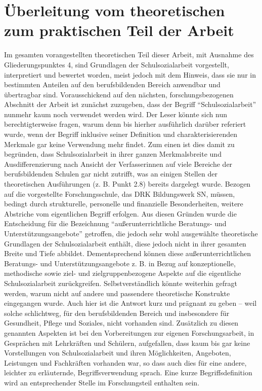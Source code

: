 \section{Überleitung vom theoretischen zum praktischen Teil der Arbeit}
\label{sec:ÜberleitungVomTheoretischenZumPraktischenTeilDerArbeit}

Im gesamten vorangestellten theoretischen Teil dieser Arbeit, mit Ausnahme des Gliederungspunktes 4,  sind Grundlagen der Schulsozialarbeit vorgestellt, interpretiert und bewertet worden, meist jedoch mit dem Hinweis, dass sie nur in bestimmten Anteilen auf den berufsbildenden Bereich anwendbar und übertragbar sind. Vorausschickend auf den nächsten, forschungsbezogenen Abschnitt der Arbeit ist zunächst zuzugeben, dass der Begriff "`Schulsozialarbeit"' nunmehr kaum noch verwendet werden wird. Der Leser könnte sich nun berechtigterweise fragen, warum denn bis hierher ausführlich darüber referiert wurde, wenn der Begriff inklusive seiner Definition und charakterisierenden Merkmale gar keine Verwendung mehr findet. Zum einen ist dies damit zu begründen, dass Schulsozialarbeit in ihrer ganzen Merkmalsbreite und Ausdifferenzierung nach Ansicht der Verfasserinnen auf viele Bereiche der berufsbildenden Schulen gar nicht zutrifft, was an einigen Stellen der theoretischen Ausführungen (z. B. Punkt 2.8) bereits dargelegt wurde. Bezogen auf die vorgestellte Forschungsschule, das DRK Bildungswerk SN, müssen, bedingt durch strukturelle, personelle und finanzielle Besonderheiten, weitere Abstriche vom eigentlichen Begriff erfolgen. Aus diesen Gründen wurde die Entscheidung für die Bezeichnung "`außerunterrichtliche Beratungs- und Unterstützungsangebote"' getroffen, die jedoch sehr wohl ausgewählte theoretische Grundlagen der Schulsozialarbeit enthält, diese jedoch nicht in ihrer gesamten Breite und Tiefe abbildet. Dementsprechend können diese außerunterrichtlichen Beratungs- und Unterstützungsangebote z. B. in Bezug auf konzeptionelle, methodische sowie ziel- und zielgruppenbezogene Aspekte auf die eigentliche Schulsozialarbeit zurückgreifen. 
Selbstverständlich könnte weiterhin gefragt werden, warum nicht auf andere und passendere theoretische Konstrukte eingegangen wurde. Auch hier ist die Antwort kurz und prägnant zu geben -- weil solche schlichtweg, für den berufsbildenden Bereich und insbesondere für Gesundheit, Pflege und Soziales, nicht vorhanden sind. Zusätzlich zu diesen genannten Aspekten ist bei den Vorbereitungen zur eigenen Forschungsarbeit, in Gesprächen mit Lehrkräften und Schülern, aufgefallen, dass kaum bis gar keine Vorstellungen von Schulsozialarbeit und ihren Möglichkeiten, Angeboten, Leistungen und Fachkräften vorhanden war, so dass auch dies für eine andere, leichter zu erläuternde, Begriffsverwendung sprach. Eine kurze Begriffsdefinition wird an entsprechender Stelle im Forschungsteil enthalten sein. 

